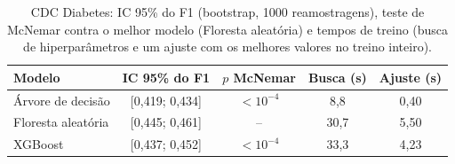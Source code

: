 \begin{table}[!t]
\centering
\caption{CDC Diabetes: IC 95\% do F1 (bootstrap, 1000 reamostragens), teste de McNemar contra o melhor modelo (Floresta aleatória) e tempos de treino (busca de hiperparâmetros e um ajuste com os melhores valores no treino inteiro).}
\label{tab:cdc_sig}
\begin{tabular}{lcccc}
\hline
Modelo & IC 95\% do F1 & $p$ McNemar & Busca (s) & Ajuste (s) \\
\hline
Árvore de decisão & [0,419; 0,434] & $<10^{-4}$ & 8,8 & 0,40 \\
Floresta aleatória & [0,445; 0,461] & -- & 30,7 & 5,50 \\
XGBoost & [0,437; 0,452] & $<10^{-4}$ & 33,3 & 4,23 \\
\hline
\end{tabular}
\end{table}